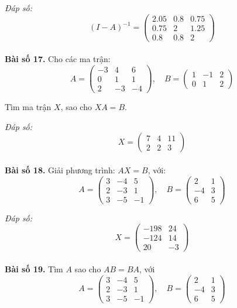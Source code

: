        \textit{Đáp số:}
        \[
        (I - A)^{-1} = \begin{pmatrix}
        2.05 & 0.8 & 0.75 \\
        0.75 & 2 & 1.25 \\
        0.8 & 0.8 & 2
        \end{pmatrix}
        \]\\
\textbf{Bài số 17.} Cho các ma trận:
        \[
        A = \begin{pmatrix}
        -3 & 4 & 6 \\
        0 & 1 & 1 \\
        2 & -3 & -4
        \end{pmatrix}, \quad B = \begin{pmatrix}
        1 & -1 & 2 \\
        0 & 1 & 2
        \end{pmatrix}
        \]
        
        Tìm ma trận \(X\), sao cho \(XA = B\).
        
        \textit{Đáp số:}
        \[
        X = \begin{pmatrix}
        7 & 4 & 11 \\
        2 & 2 & 3
        \end{pmatrix}
        \]\\
\textbf{Bài số 18.} Giải phương trình: \(AX = B\), với:
        \[
A = \begin{pmatrix}
3 & -4 & 5 \\
2 & -3 & 1 \\
3 & -5 & -1
\end{pmatrix}, \quad
B = \begin{pmatrix}
2 & 1 \\
-4 & 3 \\
6 & 5
\end{pmatrix}
\]

\textit{Đáp số:}
\[
X = \begin{pmatrix}
-198 & 24 \\
-124 & 14 \\
20 & -3
\end{pmatrix}
\]\\
\textbf{Bài số 19.} Tìm \(A\) sao cho \(AB = BA\), với
        \[
        A = \begin{pmatrix}
        3 & -4 & 5 \\
        2 & -3 & 1 \\
        3 & -5 & -1
        \end{pmatrix}, \quad B = \begin{pmatrix}
        2 & 1 \\
        -4 & 3 \\
        6 & 5
        \end{pmatrix}
        \]
        
